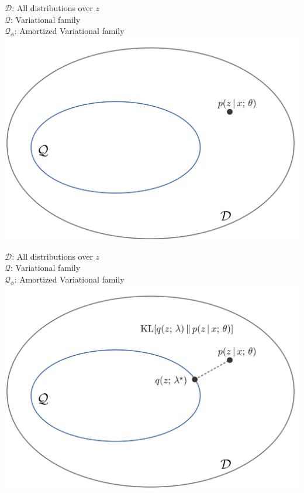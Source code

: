 \begin{frame}
$\mathcal{D}$: All distributions over $z$ \\
$\mathcal{Q}$: Variational family \\
{\color{white} $\mathcal{Q}_\phi$: Amortized Variational family }
\center
\includegraphics[scale=0.24]{pics/avi1.png}
\end{frame}
 
 
\begin{frame}
$\mathcal{D}$: All distributions over $z$ \\
$\mathcal{Q}$: Variational family \\
{\color{white} $\mathcal{Q}_\phi$: Amortized Variational family }
\center
\includegraphics[scale=0.24]{pics/avi2.png}
\end{frame}
 
